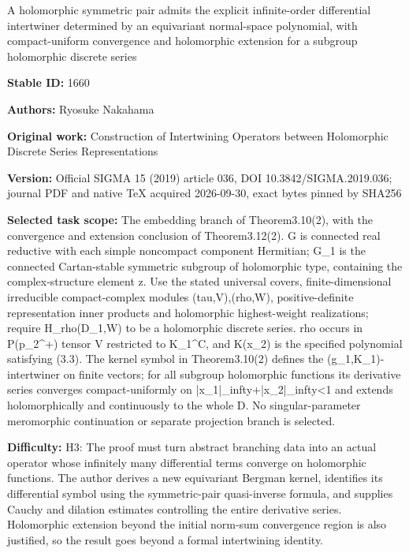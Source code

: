\documentclass[11pt]{article}
\numberwithin{equation}{section}
\begin{document}
\begin{center}\Large A holomorphic symmetric pair admits the explicit infinite-order differential intertwiner determined by an equivariant normal-space polynomial, with compact-uniform convergence and holomorphic extension for a subgroup holomorphic discrete series\end{center}
\noindent\textbf{Stable ID:} 1660\par
\noindent\textbf{Authors:} Ryosuke Nakahama\par
\noindent\textbf{Original work:} Construction of Intertwining Operators  between Holomorphic Discrete Series Representations\par
\noindent\textbf{Version:} Official SIGMA 15 (2019) article 036, DOI 10.3842/SIGMA.2019.036; journal PDF and native TeX acquired 2026-09-30, exact bytes pinned by SHA256\par
\noindent\textbf{Selected task scope:} The embedding branch of Theorem3.10(2), with the convergence and extension conclusion of Theorem3.12(2). G is connected real reductive with each simple noncompact component Hermitian; G\_1 is the connected Cartan-stable symmetric subgroup of holomorphic type, containing the complex-structure element z. Use the stated universal covers, finite-dimensional irreducible compact-complex modules (tau,V),(rho,W), positive-definite representation inner products and holomorphic highest-weight realizations; require H\_rho(D\_1,W) to be a holomorphic discrete series. rho occurs in P(p\_2\textasciicircum{}+) tensor V restricted to K\_1\textasciicircum{}C, and K(x\_2) is the specified polynomial satisfying (3.3). The kernel symbol in Theorem3.10(2) defines the (g\_1,K\_1)-intertwiner on finite vectors; for all subgroup holomorphic functions its derivative series converges compact-uniformly on |x\_1|\_infty+|x\_2|\_infty<1 and extends holomorphically and continuously to the whole D. No singular-parameter meromorphic continuation or separate projection branch is selected.\par
\noindent\textbf{Difficulty:} H3: The proof must turn abstract branching data into an actual operator whose infinitely many differential terms converge on holomorphic functions. The author derives a new equivariant Bergman kernel, identifies its differential symbol using the symmetric-pair quasi-inverse formula, and supplies Cauchy and dilation estimates controlling the entire derivative series. Holomorphic extension beyond the initial norm-sum convergence region is also justified, so the result goes beyond a formal intertwining identity.\par
\end{document}
